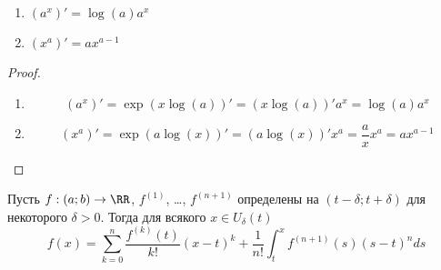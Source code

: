 \documentclass[12pt,a4paper]{article}
\begin{document}
    \begin{theorem}
        \begin{multicols}{2}
            \begin{enumerate}
                \item $(a^x)' = \log(a)a^x$
                \item $(x^a)' = a x^{a-1}$
            \end{enumerate}
        \end{multicols}
    \end{theorem}

    \begin{proof}\ 
        \begin{enumerate}
            \item \[(a^x)' = \exp(x \log(a))' = (x \log(a))' a^x = \log(a) a^x\]
            \item \[(x^a)' = \exp(a \log(x))' = (a \log(x))' x^a = \frac{a}{x} x^a = a x^{a-1}\]
        \end{enumerate}
    \end{proof}

    \begin{theorem}
        Пусть $f: (a; b) \to \RR$, $f^{(1)}$, \dots, $f^{(n+1)}$ определены на $(t-\delta; t+\delta)$ для некоторого $\delta > 0$. Тогда для всякого $x \in U_\delta(t)$
        \[f(x) = \sum_{k=0}^n \frac{f^{(k)}(t)}{k!}(x-t)^k + \frac{1}{n!} \int_t^x f^{(n+1)}(s)(s-t)^n ds\]
    \end{theorem}
\end{document}
